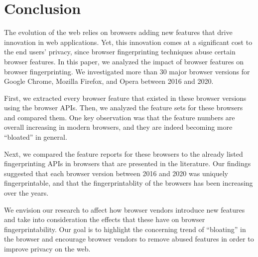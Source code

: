 \section{Conclusion}
\label{sec:conclusion}

The evolution of the web relies on browsers adding new features that drive innovation in web applications. Yet, this innovation comes at a significant cost to the end users' privacy, since browser fingerprinting techniques abuse certain browser features. In this paper, we analyzed the
impact of browser features on browser fingerprinting. We
investigated more than 30 major browser versions for Google
Chrome, Mozilla Firefox, and Opera between 2016 and 2020.

First, we extracted every browser feature that existed in these
browser versions using the browser APIs. Then, we analyzed the feature
sets for these browsers and compared them. One key observation was
that the feature numbers are overall increasing in modern browsers,
and they are indeed becoming more ``bloated'' in general.

Next, we compared the feature reports for these browsers to the
already listed fingerprinting APIs in browsers that are presented in the
literature. Our findings suggested that each browser version between 2016
and 2020 was uniquely fingerprintable, and that the fingerprintablity
of the browsers has been increasing over the years.

We envision our research to affect how browser vendors introduce new features and take into consideration the effects that these have on browser fingerprintability. Our goal is to highlight the concerning trend of ``bloating'' in the browser and encourage browser vendors to remove abused features in order to improve privacy on the web.

